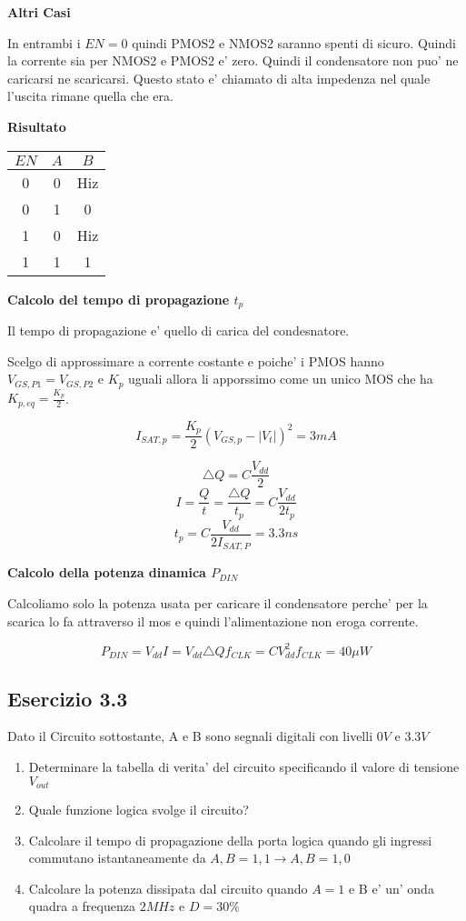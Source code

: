 \documentclass[\main/main.tex]{subfiles}
\begin{document}
\textbf{Altri Casi}

In entrambi i $EN = 0$ quindi PMOS2 e NMOS2 saranno spenti di sicuro.
Quindi la corrente sia per NMOS2 e PMOS2 e' zero.
Quindi il condensatore non puo' ne caricarsi ne scaricarsi.
Questo stato e' chiamato di alta impedenza nel quale l'uscita rimane quella che era.

\textbf{Risultato}
\begin{center}
	\begin{tabular}{ c  c | c}
		$EN$ & $A$ & $B$ \\
		\hline
		0    & 0   & Hiz \\
		0    & 1   & 0   \\
		1    & 0   & Hiz \\
		1    & 1   & 1   \\
	\end{tabular}
\end{center}

\textbf{Calcolo del tempo di propagazione $t_p$}

Il tempo di propagazione e' quello di carica del condesnatore.

Scelgo di approssimare a corrente costante e poiche' i PMOS hanno $V_{GS,P1} = V_{GS,P2}$ e $K_p$ uguali allora li apporssimo come un unico MOS che ha $K_{p,eq} =  \frac{K_p}{2}$.

\[I_{SAT,p} = \frac{K_p}{2} \left( V_{GS,p} - |V_t| \right)^2 = 3mA\]

\[ \triangle Q = C \frac{V_{dd}}{2} \]
\[ I = \frac{Q}{t} = \frac{\triangle Q}{t_p} = C \frac{V_{dd}}{2 t_p} \]
\[ t_p = C \frac{V_{dd}}{2 I_{SAT,P}} = 3.3ns\]

\textbf{Calcolo della potenza dinamica $P_{DIN}$}

Calcoliamo solo la potenza usata per caricare il condensatore perche' per la scarica lo fa attraverso il mos e quindi l'alimentazione non eroga corrente.

\[P_{DIN} = V_{dd} I = V_{dd} \triangle Q f_{CLK} = C V_{dd}^2 f_{CLK} = 40 \mu W\]

\clearpage
\subsection{Esercizio 3.3}
Dato il Circuito sottostante, A e B sono segnali digitali con livelli $0V$ e $3.3V$

\begin{enumerate}
	\item Determinare la tabella di verita' del circuito specificando il valore di tensione $V_{out}$
	\item Quale funzione logica svolge il circuito?
	\item Calcolare il tempo di propagazione della porta logica quando gli ingressi commutano istantaneamente da  $A,B = 1,1 \longrightarrow A,B = 1,0$
	\item Calcolare la potenza dissipata dal circuito quando $A=1$ e B e' un' onda quadra a frequenza $2MHz$ e $D=30\%$
\end{enumerate}
\end{document}
